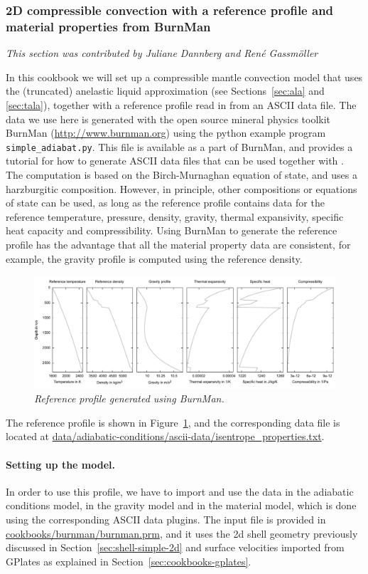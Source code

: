 \subsubsection{2D compressible convection with a reference profile and material properties from BurnMan}
\label{sec:cookbooks-burnman}
\textit{This section was contributed by Juliane Dannberg and Ren{\'e} Gassm{\"o}ller}

In this cookbook we will set up a compressible mantle convection model that uses
the (truncated) anelastic liquid approximation (see Sections~\ref{sec:ala} and
\ref{sec:tala}), together with a reference profile read in from an ASCII data file.
The data we use here is generated with the open source mineral physics toolkit BurnMan
(\url{http://www.burnman.org}) using the python example program \texttt{simple\_adiabat.py}.
This file is available as a part of BurnMan, and provides a tutorial for how to generate
ASCII data files that can be used together with \aspect{}.
The computation is based on the Birch-Murnaghan equation of state, and uses a harzburgitic
composition. However, in principle, other compositions or equations of state can be used,
as long as the reference profile contains data for the reference temperature, pressure, density,
gravity, thermal expansivity, specific heat capacity and compressibility. Using BurnMan
to generate the reference profile has the advantage that all the material property data
are consistent, for example, the gravity profile is computed using the reference density.
\begin{figure}
  \includegraphics[width=\textwidth]{cookbooks/burnman/doc/reference_profile.pdf}
  \caption{\it Reference profile generated using BurnMan.}
  \label{fig:burnman-reference-profile}
\end{figure}
The reference profile is shown in Figure~\ref{fig:burnman-reference-profile}, and the corresponding data file
is located at \url{data/adiabatic-conditions/ascii-data/isentrope_properties.txt}.

\paragraph{Setting up the \aspect{} model.}
In order to use this profile, we have to import and use the data in the adiabatic conditions
model, in the gravity model and in the material model, which is done using the corresponding
ASCII data plugins. The input file is provided in \url{cookbooks/burnman/burnman.prm}, and it uses the
2d shell geometry previously discussed in Section~\ref{sec:shell-simple-2d} and surface velocities
imported from GPlates as explained in Section~\ref{sec:cookbooks-gplates}.

